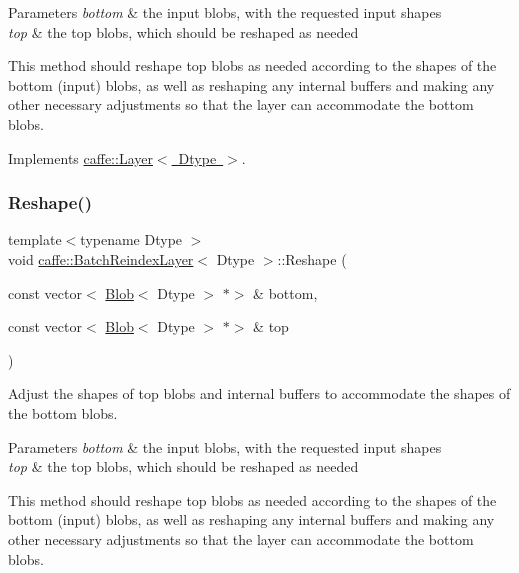 \begin{DoxyParams}{Parameters}
{\em bottom} & the input blobs, with the requested input shapes \\
\hline
{\em top} & the top blobs, which should be reshaped as needed\\
\hline
\end{DoxyParams}
This method should reshape top blobs as needed according to the shapes of the bottom (input) blobs, as well as reshaping any internal buffers and making any other necessary adjustments so that the layer can accommodate the bottom blobs. 

Implements \mbox{\hyperlink{classcaffe_1_1_layer_a7fe981e8af8d93d587acf2a952be563d}{caffe\+::\+Layer$<$ Dtype $>$}}.

\mbox{\label{classcaffe_1_1_batch_reindex_layer_a7f69b6b19387959bf0926dde7a7922a4}} 
\subsubsection{\texorpdfstring{Reshape()}{Reshape()}\hspace{0.1cm}{\footnotesize\ttfamily [2/2]}}
{\footnotesize\ttfamily template$<$typename Dtype $>$ \\
void \mbox{\hyperlink{classcaffe_1_1_batch_reindex_layer}{caffe\+::\+Batch\+Reindex\+Layer}}$<$ Dtype $>$\+::Reshape (\begin{DoxyParamCaption}\item[{const vector$<$ \mbox{\hyperlink{classcaffe_1_1_blob}{Blob}}$<$ Dtype $>$ $\ast$$>$ \&}]{bottom,  }\item[{const vector$<$ \mbox{\hyperlink{classcaffe_1_1_blob}{Blob}}$<$ Dtype $>$ $\ast$$>$ \&}]{top }\end{DoxyParamCaption})\hspace{0.3cm}{\ttfamily [virtual]}}



Adjust the shapes of top blobs and internal buffers to accommodate the shapes of the bottom blobs. 


\begin{DoxyParams}{Parameters}
{\em bottom} & the input blobs, with the requested input shapes \\
\hline
{\em top} & the top blobs, which should be reshaped as needed\\
\hline
\end{DoxyParams}
This method should reshape top blobs as needed according to the shapes of the bottom (input) blobs, as well as reshaping any internal buffers and making any other necessary adjustments so that the layer can accommodate the bottom blobs. 

